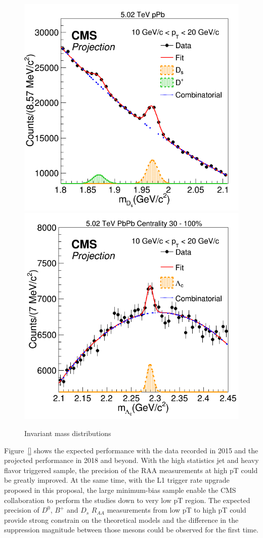 \begin{figure}[!ht]
\begin{center}
\includegraphics[width=.45\textwidth]{InvMassFigures/Ds.png}
\includegraphics[width=.45\textwidth]{InvMassFigures/LambdaC.png}
\caption{Invariant mass distributions}
\label{fig:HFMesonMass}
\end{center}
\end{figure}

Figure~\ref{} shows the expected performance with the data recorded in 2015 and the projected performance in 2018 and beyond. With the high statistics jet and heavy flavor triggered sample, the precision of the RAA measurements at high pT could be greatly improved. At the same time, with the L1 trigger rate upgrade proposed in this proposal, the large minimum-bias sample enable the CMS collaboration to perform the studies down to very low pT region. The expected precision of $D^0$, $B^+$ and $D_s$ $R_{AA}$ measurements from low pT to high pT could provide strong constrain on the theoretical models and the difference in the suppression magnitude between those mesons could be observed for the first time.


